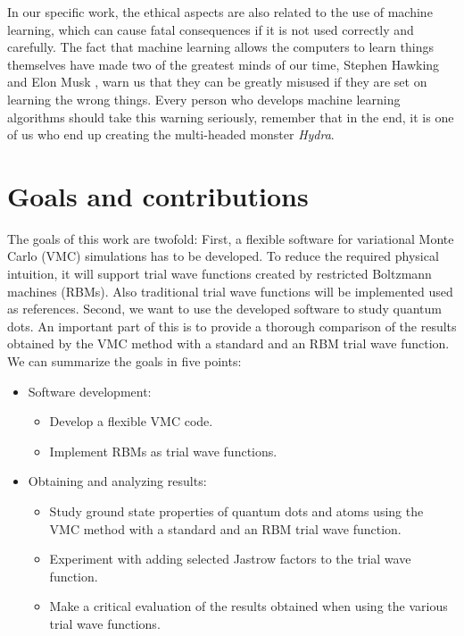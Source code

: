In our specific work, the ethical aspects are also related to the use of machine learning, which can cause fatal consequences if it is not used correctly and carefully. The fact that machine learning allows the computers to learn things themselves have made two of the greatest minds of our time, Stephen Hawking \supercite{cellan-jones_hawking:_2014} and Elon Musk \supercite{vance_elon_2015}, warn us that they can be greatly misused if they are set on learning the wrong things. Every person who develops machine learning algorithms should take this warning seriously, remember that in the end, it is one of us who end up creating the multi-headed monster \textit{Hydra}.

\section{Goals and contributions} \label{sec:goals}
The goals of this work are twofold: First, a flexible software for variational Monte Carlo (VMC) simulations has to be developed. To reduce the required physical intuition, it will support trial wave functions created by restricted Boltzmann machines (RBMs). Also traditional trial wave functions will be implemented used as references. Second, we want to use the developed software to study quantum dots. An important part of this is to provide a thorough comparison of the results obtained by the VMC method with a standard and an RBM trial wave function. We can summarize the goals in five points:
\begin{itemize}
	\item Software development:
	\begin{itemize}
		\item Develop a flexible VMC code.
		\item Implement RBMs as trial wave functions.
	\end{itemize}
	\item Obtaining and analyzing results:
	\begin{itemize}
		\item Study ground state properties of quantum dots and atoms using the VMC method with a standard and an RBM trial wave function.
		\item Experiment with adding selected Jastrow factors to the trial wave function.
		\item Make a critical evaluation of the results obtained when using the various trial wave functions.
	\end{itemize}
\end{itemize}

